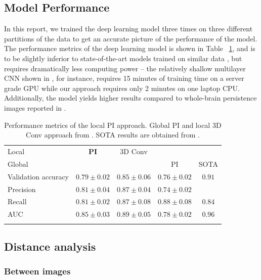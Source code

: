 \documentclass{article}
\begin{document}
\subsection{Model Performance}

In this report, we trained the deep learning model three times on three different partitions of the data to get an accurate picture of the performance of the model. The performance metrics of the deep learning model is shown in Table ~\ref{tab:performance}, and is to be slightly inferior to state-of-the-art models trained on similar data \citep{wen2020convolutional}, but requires dramatically less computing power -- the relatively shallow multilayer CNN shown in \citep{bruningk2020image}, for instance, requires 15 minutes of training time on a server grade GPU while our approach requires only 2 minutes on one laptop CPU. Additionally, the model yields higher results compared to whole-brain persistence images reported in \citep{bruningk2020image}.

\begin{table}[b]
  \centering
  \begin{tabular}{lcccc}
    \toprule
    Local & \textbf{PI} & 3D Conv & & \\
    Global &&& PI & SOTA \\
    \midrule
    Validation accuracy & $0.79\pm 0.02$ & $0.85\pm 0.06$ & $ 0.76\pm 0.02$ & $0.91$\\
    Precision & $0.81\pm 0.04$  & $0.87\pm0.04$ &  $0.74\pm 0.02$& \\
    Recall & $0.81\pm 0.02$ & $0.87\pm0.08$ & $0.88\pm 0.08$ &$0.84$\\
    AUC & $0.85\pm 0.03$ & $0.89\pm0.05$ &  $ 0.78\pm 0.02$ & $0.96$\\
    \bottomrule
    \vspace{1pt}
  \end{tabular}
  \caption{Performance metrics of the local PI approach. Global PI and local 3D Conv approach from \citep{bruningk2020image}. SOTA results are obtained from \citep{liu2018anatomical}.}
  \label{tab:performance}
\end{table}

\subsection{Distance analysis}

\subsubsection{Between images}\label{sec:results_between_images}
\end{document}
